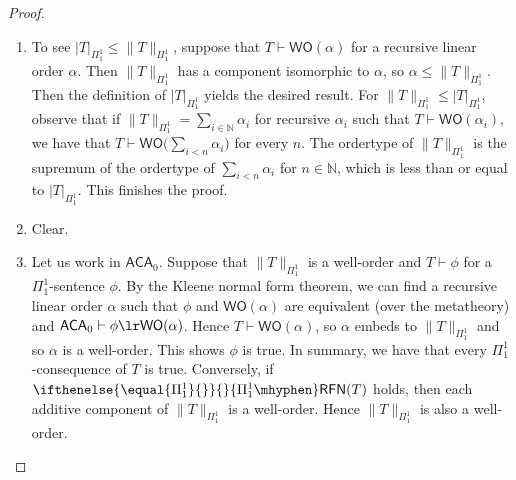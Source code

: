 \documentclass{mhkr}
\newcommand{\added}[1]{#1}
\newcommand{\bbN}{\mathbb{N}}
\newcommand{\WO}{\mathsf{WO}}
\newcommand{\RFN}[1][]{\ifthenelse{\equal{#1}{}}{}{#1\mhyphen}\mathsf{RFN}}
\newcommand{\ACA}{\mathsf{ACA}}
\begin{document}
\begin{proof}
    \added{
    \begin{enumerate}
        \item To see $|T|_{\Pi^1_1}\le \|T\|_{\Pi^1_1}$, suppose that $T\vdash \WO(\alpha)$ for a recursive linear order $\alpha$. Then $\|T\|_{\Pi^1_1}$ has a component isomorphic to $\alpha$, so $\alpha \le \|T\|_{\Pi^1_1}$. Then the definition of $|T|_{\Pi^1_1}$ yields the desired result.
        For $\|T\|_{\Pi^1_1} \le |T|_{\Pi^1_1}$, observe that if $\|T \|_{\Pi^1_1} = \sum_{i\in\bbN} \alpha_i$ for recursive $\alpha_i$ such that $T\vdash \WO(\alpha_i)$, we have that $T\vdash \WO\bigl(\sum_{i<n} \alpha_i\bigr)$ for every $n$. 
        The ordertype of $\|T\|_{\Pi^1_1}$ is the supremum of the ordertype of $\sum_{i<n}\alpha_i$ for $n\in \bbN$, which is less than or equal to $|T|_{\Pi^1_1}$. This finishes the proof.
        \item Clear.
        \item Let us work in $\ACA_0$. Suppose that $\|T\|_{\Pi^1_1}$ is a well-order and $T\vdash \phi$ for a $\Pi^1_1$-sentence $\phi$. By the Kleene normal form theorem, we can find a recursive linear order $\alpha$ such that $\phi$ and $\WO(\alpha)$ are equivalent (over the metatheory) and $\ACA_0\vdash \phi \lr \WO(\alpha)$. Hence $T\vdash \WO(\alpha)$, so $\alpha$ embeds to $\|T\|_{\Pi^1_1}$ and so $\alpha$ is a well-order. This shows $\phi$ is true. In summary, we have that every $\Pi^1_1$-consequence of $T$ is true.
        Conversely, if $\RFN[\Pi^1_1](T)$ holds, then each additive component of $\|T\|_{\Pi^1_1}$ is a well-order. Hence $\|T\|_{\Pi^1_1}$ is also a well-order. \qedhere 
    \end{enumerate}}
\end{proof}
\end{document}
